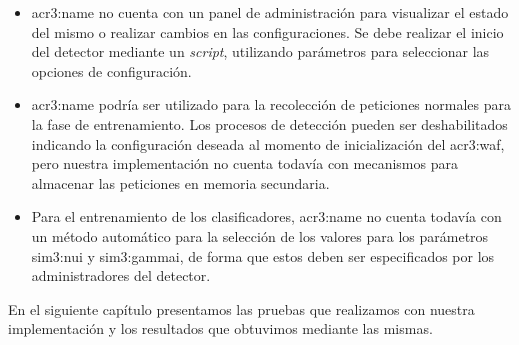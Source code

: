 \begin{itemize}
    \item
    \gls{acr3:name} no cuenta con un panel de administración para visualizar
    el estado del mismo o realizar cambios en las configuraciones. Se debe
    realizar el inicio del detector mediante un \textit{script}, utilizando
    parámetros para seleccionar las opciones de configuración.

    \item
    \gls{acr3:name} podría ser utilizado para la recolección de peticiones
    normales para la fase de entrenamiento. Los procesos de detección
    pueden ser deshabilitados indicando la configuración deseada al momento
    de inicialización del \gls{acr3:waf}, pero nuestra implementación
    no cuenta todavía con mecanismos para almacenar las peticiones en
    memoria secundaria.

    \item
    Para el entrenamiento de los clasificadores, \gls{acr3:name} no
    cuenta todavía con un método automático para la selección de los
    valores para los parámetros \gls{sim3:nui} y \gls{sim3:gammai},
    de forma que estos deben ser especificados por los administradores
    del detector.
\end{itemize}

En el siguiente capítulo presentamos las pruebas que realizamos con nuestra
implementación y los resultados que obtuvimos mediante las mismas.
